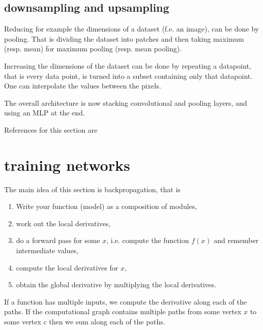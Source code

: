 \documentclass[12 pt]{article}        	%
\begin{document}
\subsection{downsampling and upsampling}

Reducing for example the dimensions of a dataset (f.e. an image), can be done by pooling.
That is dividing the dataset into patches and then taking maximum (resp. mean) for maximum pooling (resp. mean pooling).

Increasing the dimensions of the dataset can be done by repeating a datapoint, that is every data point, is turned into a subset containing only that datapoint.
One can interpolate the values between the pixels. 

The overall architecture is now stacking convolutional and pooling layers, and using an MLP at the end.

References for this section are
\begin{center}
    \cite[ch.10]{prince2023understanding}
\end{center}

\section{training networks}

The main idea of this section is backpropagation, that is 
\begin{enumerate}
    \item 
    Write your function (model) as a composition of modules,

    \item 
    work out the local derivatives,

    \item 
    do a forward pass for some $ x $, i.e. compute the function $ f ( x ) $ and remember intermediate values,

    \item 
    compute the local derivatives for $ x $,

    \item 
    obtain the global derivative by multiplying the local derivatives.
\end{enumerate}

If a function has multiple inputs, we compute the derivative along each of the paths.
If the computational graph contains multiple paths from some vertex $ x $ to some vertex $ c $ then we sum along each of the paths.
\end{document}
